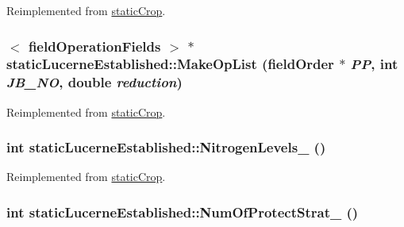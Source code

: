 Reimplemented from \hyperlink{classstatic_crop_ac8b14325e2ab05247e9b61e3af331f24}{staticCrop}.\hypertarget{classstatic_lucerne_established_a155fbfb890d5167c27a18f05517ab6fb}{
\subsubsection[{MakeOpList}]{$<$ {\bf fieldOperationFields} $>$ $\ast$ staticLucerneEstablished::MakeOpList ({\bf fieldOrder} $\ast$ {\em PP}, \/  int {\em JB\_\-NO}, \/  double {\em reduction})}}
\label{classstatic_lucerne_established_a155fbfb890d5167c27a18f05517ab6fb}


Reimplemented from \hyperlink{classstatic_crop_a9b67ef1ae531a3afb32b63a4aeb5916b}{staticCrop}.\hypertarget{classstatic_lucerne_established_ac7b10e73130036adeb73de6d771ec814}{
\subsubsection[{NitrogenLevels\_\-}]{\setlength{\rightskip}{0pt plus 5cm}int staticLucerneEstablished::NitrogenLevels\_\- ()}}
\label{classstatic_lucerne_established_ac7b10e73130036adeb73de6d771ec814}


Reimplemented from \hyperlink{classstatic_crop_a32b69ed138beaed150efa74d18e82d8e}{staticCrop}.\hypertarget{classstatic_lucerne_established_a312ee9177d791b69210a96d09b738a14}{
\subsubsection[{NumOfProtectStrat\_\-}]{\setlength{\rightskip}{0pt plus 5cm}int staticLucerneEstablished::NumOfProtectStrat\_\- ()}}
\label{classstatic_lucerne_established_a312ee9177d791b69210a96d09b738a14}


